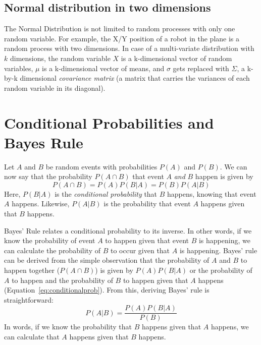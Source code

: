 \subsection{Normal distribution in two dimensions}
The Normal Distribution is not limited to random processes with only one random variable. For example, the X/Y position of a robot in the plane is a random process with two dimensions. In case of a multi-variate distribution with $k$ dimensions, the random variable $ X$ is a k-dimensional vector of random variables, $ \mu$ is a k-dimensional vector of means, and $ \sigma$ gets replaced with $ \Sigma$,  a k-by-k dimensional \textsl{covariance matrix} (a matrix that carries the variances of each random variable in its diagonal).

\section{Conditional Probabilities and Bayes Rule}\label{sec:bayesrule}
Let $A$ and $B$ be random events with probabilities $P(A)$ and $P(B)$. We can now say that the probability $P(A \cap B)$ that event $A$ \textsl{and} $B$ happen is given by
\begin{equation}\label{eq:conditionalprob}
P(A \cap B)=P(A)P(B|A)=P(B)P(A|B)
\end{equation}
Here, $P(B|A)$ is the \textsl{conditional probability} that $B$ happens, knowing that event $A$ happens. Likewise, $P(A|B)$ is the probability that event $A$ happens given that $B$ happens.

Bayes' Rule relates a conditional probability to its inverse. In other words, if we know the probability of event $A$ to happen given that event $B$ is happening, we can calculate the probability of $B$ to occur given that $A$ is happening. Bayes' rule can be derived from the simple observation that the probability of $A$ and $B$ to happen together ($P(A \cap B)$) is given by $P(A)P(B|A)$ or the probability of $A$ to happen and the probability of $B$ to happen given that $A$ happens (Equation~\ref{eq:conditionalprob}).
From this, deriving Bayes' rule is straightforward:
\begin{equation}
P(A|B)=\frac{P(A)P(B|A)}{P(B)}
\end{equation}
In words, if we know the probability that $B$ happens given that $A$ happens, we can calculate that $A$ happens given that $B$ happens.

